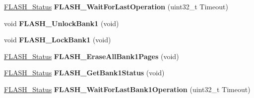 \begin{DoxyCompactItemize}
\item 
\hypertarget{group__FLASH__Exported__Functions_ga2ad803999ae93ec03700983c59cae264}{
\hyperlink{group__FLASH__Exported__Types_gadc63a6f3404ff1f71229a66915e9cdc0}{FLASH\_\-Status} {\bfseries FLASH\_\-WaitForLastOperation} (uint32\_\-t Timeout)}
\label{group__FLASH__Exported__Functions_ga2ad803999ae93ec03700983c59cae264}

\item 
\hypertarget{group__FLASH__Exported__Functions_ga358c4b7e0ef20693ca62cc9d20c94a5a}{
void {\bfseries FLASH\_\-UnlockBank1} (void)}
\label{group__FLASH__Exported__Functions_ga358c4b7e0ef20693ca62cc9d20c94a5a}

\item 
\hypertarget{group__FLASH__Exported__Functions_gafe4188ab9eb12c046970660f65a3faf9}{
void {\bfseries FLASH\_\-LockBank1} (void)}
\label{group__FLASH__Exported__Functions_gafe4188ab9eb12c046970660f65a3faf9}

\item 
\hypertarget{group__FLASH__Exported__Functions_ga2036728450ee18e789b25fe3fd9c80ee}{
\hyperlink{group__FLASH__Exported__Types_gadc63a6f3404ff1f71229a66915e9cdc0}{FLASH\_\-Status} {\bfseries FLASH\_\-EraseAllBank1Pages} (void)}
\label{group__FLASH__Exported__Functions_ga2036728450ee18e789b25fe3fd9c80ee}

\item 
\hypertarget{group__FLASH__Exported__Functions_ga9d5b76b75ef4c578cc45dc836a1929b6}{
\hyperlink{group__FLASH__Exported__Types_gadc63a6f3404ff1f71229a66915e9cdc0}{FLASH\_\-Status} {\bfseries FLASH\_\-GetBank1Status} (void)}
\label{group__FLASH__Exported__Functions_ga9d5b76b75ef4c578cc45dc836a1929b6}

\item 
\hypertarget{group__FLASH__Exported__Functions_ga470d345c2ea4304f899aa988bdd23824}{
\hyperlink{group__FLASH__Exported__Types_gadc63a6f3404ff1f71229a66915e9cdc0}{FLASH\_\-Status} {\bfseries FLASH\_\-WaitForLastBank1Operation} (uint32\_\-t Timeout)}
\label{group__FLASH__Exported__Functions_ga470d345c2ea4304f899aa988bdd23824}

\end{DoxyCompactItemize}
